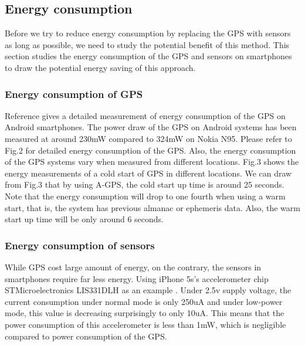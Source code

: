 \documentclass[journal]{IEEEtran}
\begin{document}
\subsection{Energy consumption}
Before we try to reduce energy consumption by replacing the GPS with sensors as long as possible, we need to study the potential benefit of this method. 
This section studies the energy consumption of the GPS and sensors on smartphones to draw the potential energy saving of this approach. 

\subsubsection{Energy consumption of GPS} 
Reference \cite{GPS Measurements} gives a detailed measurement of energy consumption of the GPS on Android smartphones. 
The power draw of the GPS on Android systems has been measured at around 230mW compared to 324mW on Nokia N95. 
Please refer to Fig.2 for detailed energy consumption of the GPS. 
Also, the energy consumption of the GPS systems vary when measured from different locations.
Fig.3 shows the energy measurements of a cold start of GPS in different locations.
We can draw from Fig.3 that by using A-GPS, the cold start up time is around 25 seconds.
Note that the energy consumption will drop to one fourth when using a warm start, that is, the system has previous almanac or ephemeris data. 
Also, the warm start up time will be only around 6 seconds. 

\subsubsection{Energy consumption of sensors} 
While GPS cost large amount of energy, on the contrary, the sensors in smartphones require far less energy. 
Using iPhone 5s's accelerometer chip STMicroelectronics LIS331DLH as an example \cite{Acc Measurements}. 
Under 2.5v supply voltage, the current consumption under normal mode is only 250uA and under low-power mode, this value is decreasing surprisingly to only 10uA. 
This means that the power consumption of this accelerometer is less than 1mW, which is negligible compared to power consumption of the GPS. 
\end{document}
